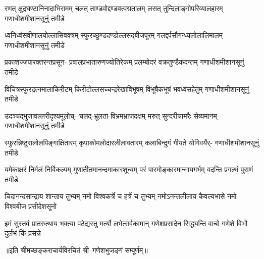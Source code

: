 

\fourlineindentedshloka
{रणत् क्षुद्रघण्टानिनादाभिरामम्}
{चलत् ताण्डवोद्दण्डवत्पद्मतालम्}
{लसत् तुन्दिलाङ्गोपरिव्यालहारम्}
{गणाधीशमीशानसूनुं तमीडे}%

\fourlineindentedshloka
{ध्वनिध्वंसवीणालयोल्लासिवक्त्रम्}
{स्फुरच्छुण्डदण्डोल्लसद्‌बीजपूरम्}
{गलद्दर्पसौगन्ध्यलोलालिमालम्}
{गणाधीशमीशानसूनुं तमीडे}%

\fourlineindentedshloka
{प्रकाशज्जपारक्तरन्तप्रसून-}
{प्रवालप्रभातारुणज्योतिरेकम्}
{प्रलम्बोदरं वक्रतुण्डैकदन्तम्}
{गणाधीशमीशानसूनुं तमीडे}%

\fourlineindentedshloka
{विचित्रस्फुरद्रत्नमालाकिरीटम्}
{किरीटोल्लसच्चन्द्ररेखाविभूषम्}
{विभूषैकभूषं भवध्वंसहेतुम्}
{गणाधीशमीशानसूनुं तमीडे}%

\fourlineindentedshloka
{उदञ्चद्भुजावल्लरीदृश्यमूलोच्-}
{चलद्‌-भ्रूलता-विभ्रमभ्राजदक्षम्}
{मरुत् सुन्दरीचामरैः सेव्यमानम्}
{गणाधीशमीशानसूनुं तमीडे}%

\fourlineindentedshloka
{स्फुरन्निष्ठुरालोलपिङ्गाक्षितारम्}
{कृपाकोमलोदारलीलावतारम्}
{कलाबिन्दुगं गीयते योगिवर्यैर्-}
{गणाधीशमीशानसूनुं तमीडे}%

\fourlineindentedshloka
{यमेकाक्षरं निर्मलं निर्विकल्पम्}
{गुणातीतमानन्दमाकारशून्यम्}
{परं पारमोङ्कारमान्मायगर्भम्}
{वदन्ति प्रगल्भं पुराणं तमीडे}%

\fourlineindentedshloka
{चिदानन्दसान्द्राय शान्ताय तुभ्यम्}
{नमो विश्वकर्त्रे च हर्त्रे च तुभ्यम्}
{नमोऽनन्तलीलाय कैवल्यभासे}
{नमो विश्वबीज प्रसीदेशसूनो}%

\fourlineindentedshloka
{इमं सुस्तवं प्रातरुत्थाय भक्त्या}
{पठेद्यस्तु मर्त्यो लभेत्सर्वकामान्}
{गणेशप्रसादेन सिद्ध्यन्ति वाचो}
{गणेशे विभौ दुर्लभं किं प्रसन्ने}%

॥इति श्रीमच्छङ्कराचार्यविरचितं श्री~गणेशभुजङ्गं सम्पूर्णम्॥
